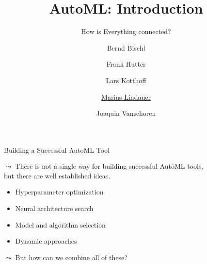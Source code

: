 




\title[AutoML: Connections]{AutoML: Introduction}
\subtitle{How is Everything connected?}
\author[Marius Lindauer]{Bernd Bischl \and Frank Hutter \and Lars Kotthoff\newline \and \underline{Marius Lindauer} \and Joaquin Vanschoren}
\institute{}
\date{}





	
	\maketitle
	
	\begin{frame}[c]{Building a Successful AutoML Tool}
		
	 $\leadsto$ There is not a single way for building successful AutoML tools,\\
	 but there are well established ideas.
	 \begin{itemize}
	 	\item Hyperparameter optimization
	 	\item Neural architecture search
	 	\item Model and algorithm selection
	 	\item Dynamic approaches
	 \end{itemize}
	
	$\leadsto$ But how can we combine all of these?
	 		
	\end{frame}
	
